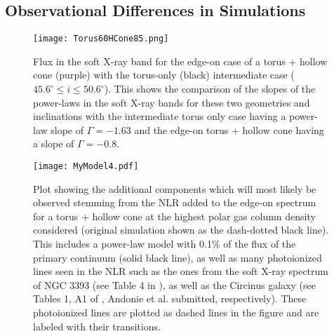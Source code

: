 \documentclass[fleqn,usenatbib]{mnras}
\begin{document}
        \subsection{Observational Differences in Simulations}
        
            \begin{figure}
                \centering
                \texttt{[image: Torus60HCone85.png]}
                \caption{Flux in the soft X-ray band for the edge-on case of a torus + hollow cone (purple) with the torus-only (black) intermediate case ($45.6^{\circ} \leq i \leq 50.6^{\circ}$). This shows the comparison of the slopes of the power-laws in the soft X-ray bands for these two geometries and inclinations with the intermediate torus only case having a power-law slope of $\Gamma = -1.63$ and the edge-on torus + hollow cone having a slope of $\Gamma = -0.8$.}
                \label{fig8.5}
            \end{figure}
        
            \begin{figure}
                \centering
                \texttt{[image: MyModel4.pdf]}
                \caption{Plot showing the additional components which will most likely be observed stemming from the NLR added to the edge-on spectrum for a torus + hollow cone at the highest polar gas column density considered (original simulation shown as the dash-dotted black line). This includes a power-law model with 0.1\% of the flux of the primary continuum (solid black line), as well as many photoionized lines seen in the NLR such as the ones from the soft X-ray spectrum of NGC 3393 (see Table 4 in \citealp{2006A&A...448..499B}), as well as the Circinus galaxy (see Tables 1, A1 of \citealp{2001ApJ...546L..13S, 2014ApJ...791...81A}, Andonie et al. submitted, respectively). These photoionized lines are plotted as dashed lines in the figure and are labeled with their transitions.}
                \label{fig10.5}
            \end{figure}
            
\end{document}
